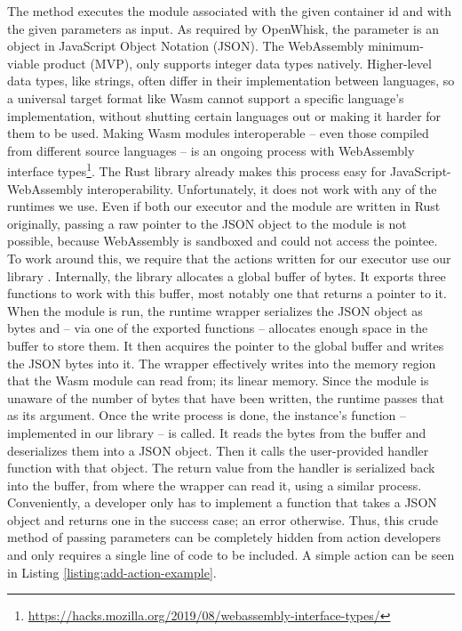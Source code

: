 The  method executes the module associated with the given container id and with the given parameters as input. As required by OpenWhisk, the parameter is an object in JavaScript Object Notation (JSON). The WebAssembly minimum-viable product (MVP), only supports integer data types natively. Higher-level data types, like strings, often differ in their implementation between languages, so a universal target format like Wasm cannot support a specific language's implementation, without shutting certain languages out or making it harder for them to be used. Making Wasm modules interoperable -- even those compiled from different source languages -- is an ongoing process with WebAssembly interface types\footnote{\url{https://hacks.mozilla.org/2019/08/webassembly-interface-types/}}. The  Rust library already makes this process easy for JavaScript-WebAssembly interoperability. Unfortunately, it does not work with any of the runtimes we use. Even if both our executor and the module are written in Rust originally, passing a raw pointer to the JSON object to the module is not possible, because WebAssembly is sandboxed and could not access the pointee. To work around this, we require that the actions written for our executor use our library . Internally, the library allocates a global buffer of bytes. It exports three functions to work with this buffer, most notably one that returns a pointer to it. When the module is run, the runtime wrapper serializes the JSON object as bytes and -- via one of the exported functions -- allocates enough space in the buffer to store them. It then acquires the pointer to the global buffer and writes the JSON bytes into it. The wrapper effectively writes into the memory region that the Wasm module can read from; its linear memory. Since the module is unaware of the number of bytes that have been written, the runtime passes that as its  argument.
Once the write process is done, the instance's  function -- implemented in our library -- is called. It reads the  bytes from the buffer and deserializes them into a JSON object. Then it calls the user-provided handler function with that object. The return value from the handler is serialized back into the buffer, from where the wrapper can read it, using a similar process.
Conveniently, a developer only has to implement a function that takes a JSON object and returns one in the success case; an error otherwise. Thus, this crude method of passing parameters can be completely hidden from action developers and only requires a single line of code to be included. A simple action can be seen in Listing \ref{listing:add-action-example}. 

